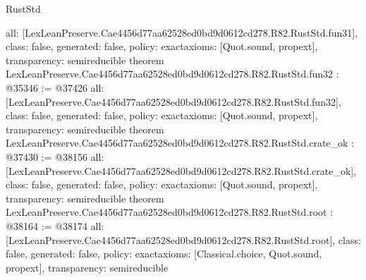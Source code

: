 \begin{lexlean}{RustStd}
\begin{coremodule}
{  all: [LexLeanPreserve.Cae4456d77aa62528ed0bd9d0612cd278.R82.RustStd.fun31],
  class: false,
  generated: false,
  policy: exact{axioms: [Quot.sound, propext]},
  transparency: semireducible
}
theorem LexLeanPreserve.Cae4456d77aa62528ed0bd9d0612cd278.R82.RustStd.fun32 : @35346 := @37426 {
  all: [LexLeanPreserve.Cae4456d77aa62528ed0bd9d0612cd278.R82.RustStd.fun32],
  class: false,
  generated: false,
  policy: exact{axioms: [Quot.sound, propext]},
  transparency: semireducible
}
theorem LexLeanPreserve.Cae4456d77aa62528ed0bd9d0612cd278.R82.RustStd.crate_ok : @37430 := @38156 {
  all: [LexLeanPreserve.Cae4456d77aa62528ed0bd9d0612cd278.R82.RustStd.crate_ok],
  class: false,
  generated: false,
  policy: exact{axioms: [Quot.sound, propext]},
  transparency: semireducible
}
theorem LexLeanPreserve.Cae4456d77aa62528ed0bd9d0612cd278.R82.RustStd.root : @38164 := @38174 {
  all: [LexLeanPreserve.Cae4456d77aa62528ed0bd9d0612cd278.R82.RustStd.root],
  class: false,
  generated: false,
  policy: exact{axioms: [Classical.choice, Quot.sound, propext]},
  transparency: semireducible
}


\end{coremodule}
\end{lexlean}

